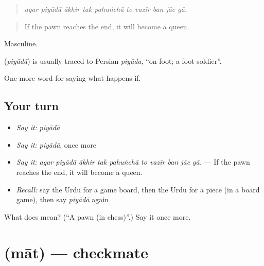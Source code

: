 \begin{quote}
         
\end{quote}

\begin{quote}
\emph{agar piyādā ākhir tak pahuṅchā to vazīr ban jāe gā.}
\end{quote}

\begin{quote}
If the pawn reaches the end, it will become a queen.
\end{quote}

Masculine.

\begin{cousinweb}
\textbf{} (\emph{piyādā}) is usually traced to Persian \emph{piyāda}, \textquotedblleft{}on foot; a foot soldier\textquotedblright{}.
\end{cousinweb}

\begin{grammarlens}[title={What you've built}]
One more word for saying what happens if.
\end{grammarlens}

\subsection*{Your turn}
\begin{itemize}
\raggedright
  \item \emph{Say it:} \emph{piyādā}
  \item \emph{Say it:} \emph{piyādā}, once more
  \item \emph{Say it:} \emph{agar piyādā ākhir tak pahuṅchā to vazīr ban jāe gā.} — If the pawn reaches the end, it will become a queen.
  \item \emph{Recall:} say the Urdu for a game board, then the Urdu for a piece (in a board game), then say \emph{piyādā} again
\end{itemize}

\begin{tcolorbox}[breakable,colback=teal!4,colframe=teal!35!black,title={Before you move on}]
What does  mean? (\textquotedblleft{}A pawn (in chess)\textquotedblright{}.) Say it once more.
\end{tcolorbox}
\section[\texorpdfstring{\ur{مات} (māt)}{مات (māt)}]{ (māt) — checkmate}

